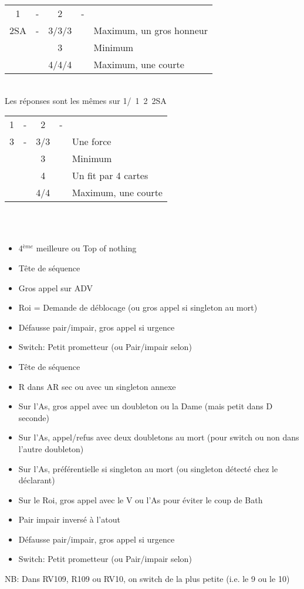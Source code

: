 \documentclass[a4paper, oneside, 11pt]{report}
\begin{document}
	\begin{tabular}{cccc|l}
	1\pique & -  & 2\pique & - &\\
	2SA & - & 3\trefle/3\carreau/3\coeur && Maximum,  un gros honneur\\
	&& 3\pique && Minimum\\
	&& 4\trefle/4\carreau/4\coeur && Maximum,  une courte\\
	\end{tabular}\\
	Les réponses sont les mêmes sur 1\trefle/\carreau\ 1\pique\ 2\pique\ 2SA\\

	\begin{tabular}{cccc|l}
	1\pique & -  & 2\pique & - &\\
	3\trefle & - & 3\carreau/3\coeur && Une force\\
	&& 3\pique && Minimum\\
	&& 4\trefle && Un fit par 4 cartes\\
	&& 4\carreau/4\coeur && Maximum,  une courte\\
	\end{tabular}\\\\

		\begin{itemize}
		\item 4$^{ème}$ meilleure ou Top of nothing
		\item Tête de séquence
		\item Gros appel sur ADV
		\item Roi = Demande de déblocage (ou gros appel si singleton au mort)
		\item Défausse pair/impair,  gros appel si urgence
		\item Switch: Petit prometteur (ou Pair/impair selon)\\
		\end{itemize}

		\begin{itemize}
		\item Tête de séquence
		\item R dans AR sec ou avec un singleton annexe
		\item Sur l'As,  gros appel avec un doubleton ou la Dame (mais petit dans D seconde)
		\item Sur l'As,  appel/refus avec deux doubletons au mort (pour switch ou non dans l'autre doubleton)
		\item Sur l'As,  préférentielle si singleton au mort (ou singleton détecté chez le déclarant)
		\item Sur le Roi,  gros appel avec le V ou l'As pour éviter le coup de Bath
		\item Pair impair inversé à l'atout
		\item Défausse pair/impair,  gros appel si urgence
		\item Switch: Petit prometteur (ou Pair/impair selon)\\
		\end{itemize}
		NB: Dans RV109, R109 ou RV10,  on switch de la plus petite (i.e.  le 9 ou le 10)
\end{document}
